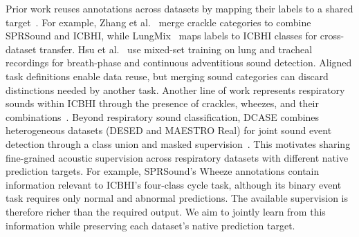 Prior work reuses annotations across datasets by mapping their labels to a shared target~\cite{bevandic2022overlapping}. For example, Zhang et al.~\cite{zhang2022sprsound} merge crackle categories to combine SPRSound and ICBHI, while LungMix~\cite{ge2025lungmix} maps labels to ICBHI classes for cross-dataset transfer. Hsu et al.~\cite{hsu2023mixedset} use mixed-set training on lung and tracheal recordings for breath-phase and continuous adventitious sound detection. Aligned task definitions enable data reuse, but merging sound categories can discard distinctions needed by another task. Another line of work represents respiratory sounds within ICBHI through the presence of crackles, wheezes, and their combinations~\cite{zhang2026ocad,chua2024multibreath,jeong2026pcmcl}. Beyond respiratory sound classification, DCASE combines heterogeneous datasets (DESED and MAESTRO Real) for joint sound event detection through a class union and masked supervision~\cite{cornell2024dcase}. This motivates sharing fine-grained acoustic supervision across respiratory datasets with different native prediction targets. For example, SPRSound's Wheeze annotations contain information relevant to ICBHI's four-class cycle task, although its binary event task requires only normal and abnormal predictions\cite{zhang2022sprsound}. The available supervision is therefore richer than the required output. We aim to jointly learn from this information while preserving each dataset's native prediction target.




